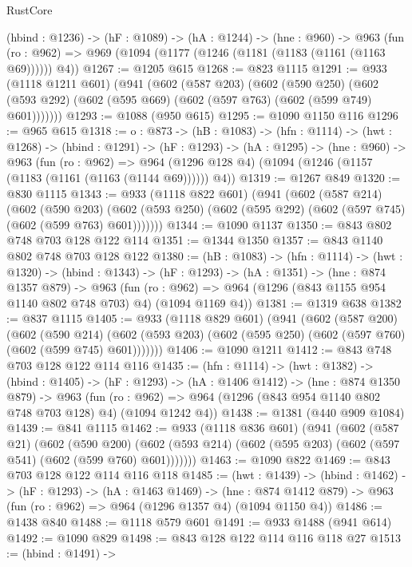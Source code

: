 \begin{lexlean}{RustCore}
\begin{coremodule}
  (hbind : @1236) ->
  (hF : @1089) ->
  (hA : @1244) ->
  (hne : @960) ->
  @963 (fun (ro : @962) => @969 (@1094 (@1177 (@1246 (@1181 (@1183 (@1161 (@1163 @69)))))) @4))
@1267 := @1205 @615
@1268 := @823 @1115
@1291 := @933
    (@1118 @1211 @601)
    (@941
      (@602
        (@587 @203)
        (@602
          (@590 @250)
          (@602 (@593 @292) (@602 (@595 @669) (@602 (@597 @763) (@602 (@599 @749) @601)))))))
@1293 := @1088 (@950 @615)
@1295 := @1090 @1150 @116
@1296 := @965 @615
@1318 := {o : @873} ->
  (hB : @1083) ->
  (hfn : @1114) ->
  (hwt : @1268) ->
  (hbind : @1291) ->
  (hF : @1293) ->
  (hA : @1295) ->
  (hne : @960) ->
  @963
    (fun (ro : @962) =>
    @964 (@1296 @128 @4) (@1094 (@1246 (@1157 (@1183 (@1161 (@1163 (@1144 @69)))))) @4))
@1319 := @1267 @849
@1320 := @830 @1115
@1343 := @933
    (@1118 @822 @601)
    (@941
      (@602
        (@587 @214)
        (@602
          (@590 @203)
          (@602 (@593 @250) (@602 (@595 @292) (@602 (@597 @745) (@602 (@599 @763) @601)))))))
@1344 := @1090 @1137
@1350 := @843 @802 @748 @703 @128 @122 @114
@1351 := @1344 @1350
@1357 := @843 @1140 @802 @748 @703 @128 @122
@1380 := (hB : @1083) ->
  (hfn : @1114) ->
  (hwt : @1320) ->
  (hbind : @1343) ->
  (hF : @1293) ->
  (hA : @1351) ->
  (hne : @874 @1357 @879) ->
  @963 (fun (ro : @962) => @964 (@1296 (@843 @1155 @954 @1140 @802 @748 @703) @4) (@1094 @1169 @4))
@1381 := @1319 @638
@1382 := @837 @1115
@1405 := @933
    (@1118 @829 @601)
    (@941
      (@602
        (@587 @200)
        (@602
          (@590 @214)
          (@602 (@593 @203) (@602 (@595 @250) (@602 (@597 @760) (@602 (@599 @745) @601)))))))
@1406 := @1090 @1211
@1412 := @843 @748 @703 @128 @122 @114 @116
@1435 := (hfn : @1114) ->
  (hwt : @1382) ->
  (hbind : @1405) ->
  (hF : @1293) ->
  (hA : @1406 @1412) ->
  (hne : @874 @1350 @879) ->
  @963 (fun (ro : @962) => @964 (@1296 (@843 @954 @1140 @802 @748 @703 @128) @4) (@1094 @1242 @4))
@1438 := @1381 (@440 @909 @1084)
@1439 := @841 @1115
@1462 := @933
    (@1118 @836 @601)
    (@941
      (@602
        (@587 @21)
        (@602
          (@590 @200)
          (@602 (@593 @214) (@602 (@595 @203) (@602 (@597 @541) (@602 (@599 @760) @601)))))))
@1463 := @1090 @822
@1469 := @843 @703 @128 @122 @114 @116 @118
@1485 := (hwt : @1439) ->
  (hbind : @1462) ->
  (hF : @1293) ->
  (hA : @1463 @1469) ->
  (hne : @874 @1412 @879) -> @963 (fun (ro : @962) => @964 (@1296 @1357 @4) (@1094 @1150 @4))
@1486 := @1438 @840
@1488 := @1118 @579 @601
@1491 := @933 @1488 (@941 @614)
@1492 := @1090 @829
@1498 := @843 @128 @122 @114 @116 @118 @27
@1513 := (hbind : @1491) ->

\end{coremodule}
\end{lexlean}
